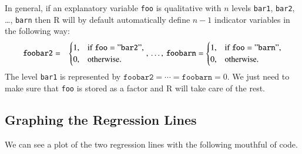 \documentclass[captions=tableheading]{scrbook}
\begin{document}
\begin{rem}
In general, if an explanatory variable \texttt{foo} is qualitative with \(n\) levels \texttt{bar1}, \texttt{bar2}, \ldots{}, \texttt{barn} then \textsf{R} will by default automatically define \(n-1\) indicator variables in the following way:
\begin{eqnarray*}
\mathtt{foobar2} & = & \begin{cases}
1, & \mbox{if }\mathtt{foo}=\mathtt{"bar2"},\\
0, & \mbox{otherwise.}\end{cases},\,\ldots,\,\mathtt{foobarn}=\begin{cases}
1, & \mbox{if }\mathtt{foo}=\mathtt{"barn"},\\
0, & \mbox{otherwise.}\end{cases}
\end{eqnarray*}
The level \texttt{bar1} is represented by \(\mathtt{foobar2}=\cdots=\mathtt{foobarn}=0\). We just need to make sure that \texttt{foo} is stored as a factor and \textsf{R} will take care of the rest. 
\end{rem}
\subsection{Graphing the Regression Lines}
\label{sec-12-6-1}


We can see a plot of the two regression lines with the following mouthful of code.
\end{document}
